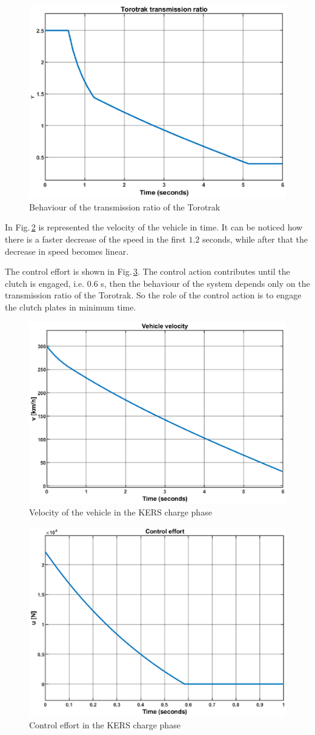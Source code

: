 \documentclass[11pt]{article}
\begin{document}
\begin{figure}[H]
\centering
\includegraphics[width=.6\textwidth]{Images/Results_Dynamics/Charge/Torotrak_ratio.eps}
\caption{Behaviour of the transmission ratio of the Torotrak}
\label{fig: CVT_ratio_charge}
\end{figure}

In Fig.\,\ref{fig: Vehicel_Vel_Charge} is represented the velocity of the vehicle in time. It can be noticed how there is a faster decrease of the speed in the first $1.2$ seconds, while after that the decrease in speed becomes linear. 

The control effort is shown in Fig.\,\ref{fig: Contro_Effort_Charge}. The control action contributes until the clutch is engaged, i.e. $0.6$ s, then the behaviour of the system depends only on the transmission ratio of the Torotrak. So the role of the control action is to engage the clutch plates in minimum time.
\begin{figure}[H]
\centering
\includegraphics[width=.6\textwidth]{Images/Results_Dynamics/Charge/Vehicle_Vel.eps}
\caption{Velocity of the vehicle in the KERS charge phase}
\label{fig: Vehicel_Vel_Charge}
\end{figure}

\begin{figure}[H]
\centering
\includegraphics[width=.6\textwidth]{Images/Results_Dynamics/Charge/Control.eps}
\caption{Control effort in the KERS charge phase}
\label{fig: Contro_Effort_Charge}
\end{figure}
\end{document}
